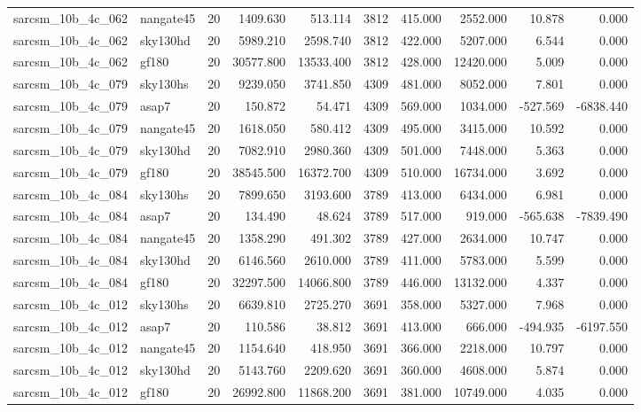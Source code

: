 \begin{tabular}{llrrrrrrrr}
sarcsm\_10b\_4c\_062 & nangate45 & 20 & 1409.630 & 513.114 & 3812 & 415.000 & 2552.000 & 10.878 & 0.000 \\
sarcsm\_10b\_4c\_062 & sky130hd & 20 & 5989.210 & 2598.740 & 3812 & 422.000 & 5207.000 & 6.544 & 0.000 \\
sarcsm\_10b\_4c\_062 & gf180 & 20 & 30577.800 & 13533.400 & 3812 & 428.000 & 12420.000 & 5.009 & 0.000 \\
sarcsm\_10b\_4c\_079 & sky130hs & 20 & 9239.050 & 3741.850 & 4309 & 481.000 & 8052.000 & 7.801 & 0.000 \\
sarcsm\_10b\_4c\_079 & asap7 & 20 & 150.872 & 54.471 & 4309 & 569.000 & 1034.000 & -527.569 & -6838.440 \\
sarcsm\_10b\_4c\_079 & nangate45 & 20 & 1618.050 & 580.412 & 4309 & 495.000 & 3415.000 & 10.592 & 0.000 \\
sarcsm\_10b\_4c\_079 & sky130hd & 20 & 7082.910 & 2980.360 & 4309 & 501.000 & 7448.000 & 5.363 & 0.000 \\
sarcsm\_10b\_4c\_079 & gf180 & 20 & 38545.500 & 16372.700 & 4309 & 510.000 & 16734.000 & 3.692 & 0.000 \\
sarcsm\_10b\_4c\_084 & sky130hs & 20 & 7899.650 & 3193.600 & 3789 & 413.000 & 6434.000 & 6.981 & 0.000 \\
sarcsm\_10b\_4c\_084 & asap7 & 20 & 134.490 & 48.624 & 3789 & 517.000 & 919.000 & -565.638 & -7839.490 \\
sarcsm\_10b\_4c\_084 & nangate45 & 20 & 1358.290 & 491.302 & 3789 & 427.000 & 2634.000 & 10.747 & 0.000 \\
sarcsm\_10b\_4c\_084 & sky130hd & 20 & 6146.560 & 2610.000 & 3789 & 411.000 & 5783.000 & 5.599 & 0.000 \\
sarcsm\_10b\_4c\_084 & gf180 & 20 & 32297.500 & 14066.800 & 3789 & 446.000 & 13132.000 & 4.337 & 0.000 \\
sarcsm\_10b\_4c\_012 & sky130hs & 20 & 6639.810 & 2725.270 & 3691 & 358.000 & 5327.000 & 7.968 & 0.000 \\
sarcsm\_10b\_4c\_012 & asap7 & 20 & 110.586 & 38.812 & 3691 & 413.000 & 666.000 & -494.935 & -6197.550 \\
sarcsm\_10b\_4c\_012 & nangate45 & 20 & 1154.640 & 418.950 & 3691 & 366.000 & 2218.000 & 10.797 & 0.000 \\
sarcsm\_10b\_4c\_012 & sky130hd & 20 & 5143.760 & 2209.620 & 3691 & 360.000 & 4608.000 & 5.874 & 0.000 \\
sarcsm\_10b\_4c\_012 & gf180 & 20 & 26992.800 & 11868.200 & 3691 & 381.000 & 10749.000 & 4.035 & 0.000 \\

\end{tabular}
